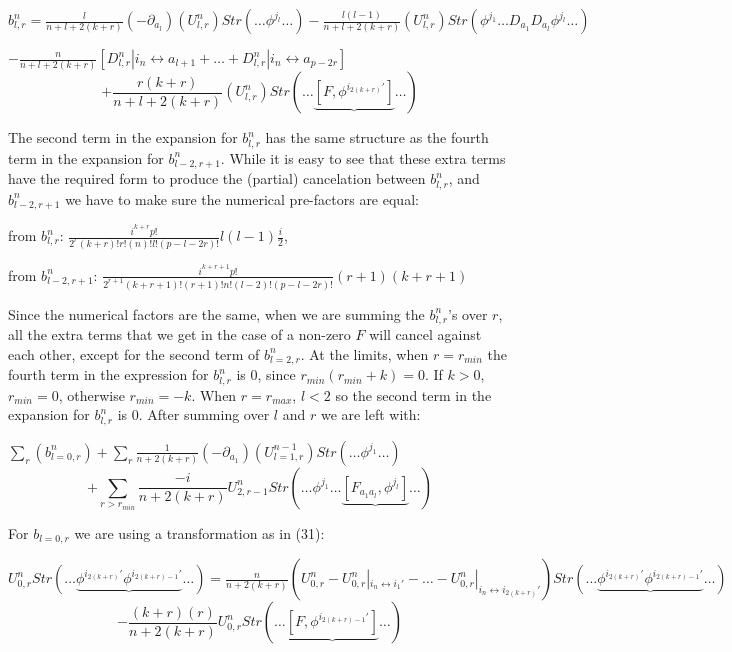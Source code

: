 \documentclass[a4paper,12pt]{article}
\begin{document}
\begin{center}
$b^n_{l,r}=\frac{l}{n+l+2(k+r)}(-\partial_{a_l})(U^n_{l,r})Str\left(\ldots \phi^{j_l}\ldots \right)-\frac{l(l-1)}{n+l+2(k+r)}(U^n_{l,r})Str\left(\phi^{j_1}\ldots D_{a_1}D_{a_l}\phi^{j_l}\ldots \right)$ 
\end{center}
\begin{center}
$-\frac{n }{n+l+2(k+r)}\left[D^n_{l,r}|i_n\leftrightarrow a_{l+1}+\ldots +D^n_{l,r}|{i_n\leftrightarrow a_{p-2r}}\right]$
\begin{equation}
+\frac{r(k+r)}{n+l+2(k+r)}(U^n_{l,r})Str\left(\ldots \underbrace{ [F,\phi^{i_{2(k+r)}'}]}\ldots \right)
\end{equation}
\end{center}
 The second term in the expansion for $b^n_{l,r}$ has the same structure as the fourth term in the expansion for $b^n_{l-2,r+1}$.
While it is easy to see that these extra terms have the required form to produce the (partial) cancelation between $b^n_{l,r}$, and  $b^n_{l-2,r+1}$ we have to make sure the numerical pre-factors are equal:
\begin{center}
from $b^n_{l,r}$: $\frac{i^{k+r}p!}{2^r(k+r)!r!(n)!l!(p-l-2r)!}l(l-1)\frac{i}{2}$, \newline

from $b^n_{l-2,r+1}$: $\frac{i^{k+r+1}p!}{2^{r+1}(k+r+1)!(r+1)!n!(l-2)!(p-l-2r)!}(r+1)(k+r+1)$
\end{center}
 Since the numerical factors are the same, when we are summing the $b^n_{l,r}$'s over $r$,  all the extra terms that we get in the case of a non-zero $F$  will cancel against each other, except for the second term of $b^n_{l=2,r}$.   At the limits, when $r=r_{min}$ the fourth term in the expression for $b^n_{l,r}$ is 0, since $r_{min}(r_{min}+k)=0$. If $k>0$, $r_{min}=0$, otherwise $r_{min}=-k$. When $r=r_{max}$, $l<2$ so the second term in the expansion for $b^n_{l,r}$ is 0. 
After summing over $l$ and $r$ we are left with:
\begin{center}
$\sum_r(b^n_{l=0,r})+\sum_r\frac{1}{n+2(k+r)}(-\partial_{a_1})(U^{n-1}_{l=1,r})Str\left(\ldots \phi^{j_1}\ldots \right)$
\begin{equation}
+\sum_{r>r_{min}}\frac{-i}{n+2(k+r)}U^n_{2,r-1}Str\left(\ldots \phi^{j_1}\ldots \underbrace{[F_{a_1a_l},\phi^{j_l}]}\ldots \right) 
\end{equation}
\end{center}
For $b_{l=0,r}$ we are using a transformation as in (31):
\begin{center}
$U^n_{0,r}Str\left(\ldots \underbrace{\phi^{i_{2(k+r)}'}\phi^{i_{2(k+r)-1}'}}\ldots \right)=\frac{n}{n+2(k+r)}(U^n_{0,r}-U^n_{0,r}|_{i_n\leftrightarrow i_1'}-\ldots -U^n_{0,r}|_{i_n\leftrightarrow i_{2(k+r)}'})Str\left(\ldots \underbrace{\phi^{i_{2(k+r)}'}\phi^{i_{2(k+r)-1}'}}\ldots \right)$
\begin{equation}
-\frac{(k+r)(r)}{n+2(k+r)}U^n_{0,r}Str\left(\ldots \underbrace{[F,\phi^{i_{2(k+r)-1}'}]}\ldots \right)
\end{equation} 
\end{center}
\end{document}
